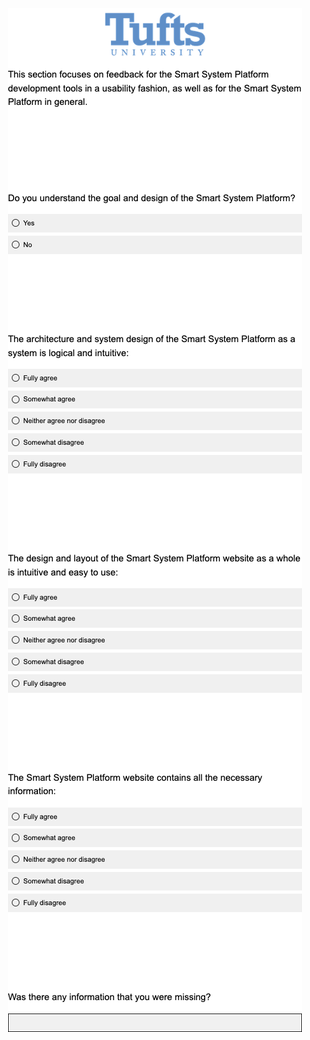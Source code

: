 \begin{multicols}{2}
\newpage
\includegraphics[width=.75\linewidth]{overleaf/images/q9.png}\\

\end{multicols}
